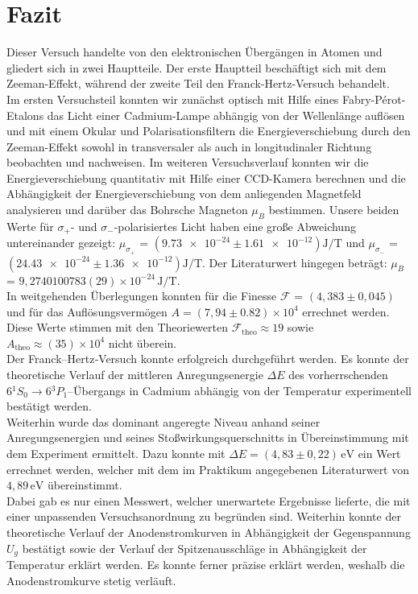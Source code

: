 \chapter{Fazit}

Dieser Versuch handelte von den elektronischen Übergängen in Atomen und gliedert sich in zwei Hauptteile. Der erste Hauptteil beschäftigt sich mit dem Zeeman-Effekt, während der zweite Teil den Franck-Hertz-Versuch behandelt.
\vspace{0.3cm}\\
Im ersten Versuchsteil konnten wir zunächst optisch mit Hilfe eines Fabry-Pérot-Etalons das Licht einer Cadmium-Lampe abhängig von der Wellenlänge auflösen und mit einem Okular und Polarisationsfiltern die Energieverschiebung durch den Zeeman-Effekt sowohl in transversaler als auch in longitudinaler Richtung beobachten und nachweisen. Im weiteren Versuchsverlauf konnten wir die Energieverschiebung quantitativ mit Hilfe einer CCD-Kamera berechnen und die Abhängigkeit der Energieverschiebung von dem anliegenden Magnetfeld analysieren und darüber das Bohrsche Magneton $\mu_B$ bestimmen. Unsere beiden Werte für $\sigma_+$- und $\sigma_-$-polarisiertes Licht haben eine große Abweichung untereinander gezeigt: $\mu_{\sigma_+}$ = $(\num{9.73e-24}\pm\num{1.61e-12}) \si{\joule\per\tesla}$ und $\mu_{\sigma_-}$ = $(\num{24.43e-24}\pm\num{1.36e-12}) \si{\joule\per\tesla}$. Der Literaturwert hingegen beträgt: $\mu_B$ = $9{,}2740100783(29)\times10^{-24}\,\mathrm{J/T}$. 
\vspace{0.3cm}\\
In weitgehenden Überlegungen konnten für die Finesse $\mathcal{F}$ = $(4,383 \pm 0,045 )$ und für das Auflösungsvermögen $A = (7,94 \pm 0.82) \times 10^4$ errechnet werden. Diese Werte stimmen mit den Theorie­werten $\mathcal{F}_{\mathrm{theo}} \approx 19$ sowie $A_{\mathrm{theo}} \approx (35)\times10^4$ nicht überein. 
\vspace{0.3cm}\\
Der Franck–Hertz‐Versuch konnte erfolgreich durchgeführt werden. Es konnte der theoretische Verlauf der mittleren Anregungsenergie $\Delta E$ des vorherrschenden $6{}^1S_0 \to 6{}^3P_1$–Übergangs in Cadmium abhängig von der Temperatur experimentell bestätigt werden. 
\vspace{0.3cm}\\
Weiterhin wurde das dominant angeregte Niveau anhand seiner Anregungsenergien und seines Stoßwirkungsquerschnitts in Übereinstimmung mit dem Experiment ermittelt. Dazu konnte mit $\Delta E = (4{,}83 \pm 0{,}22)\,\mathrm{eV}$  ein Wert errechnet werden, welcher mit dem im Praktikum angegebenen Literaturwert von $4{,}89\,\mathrm{eV}$ übereinstimmt.
\vspace{0.3cm}\\
Dabei gab es nur einen Messwert, welcher unerwartete Ergebnisse lieferte, die mit einer unpassenden Versuchsanordnung zu begründen sind. Weiterhin konnte der theoretische Verlauf der Anodenstromkurven in Abhängigkeit der Gegenspannung $U_g$ bestätigt sowie der Verlauf der Spitzenausschläge in Abhängigkeit der Temperatur erklärt werden. Es konnte ferner präzise erklärt werden, weshalb die Anodenstromkurve stetig verläuft.
